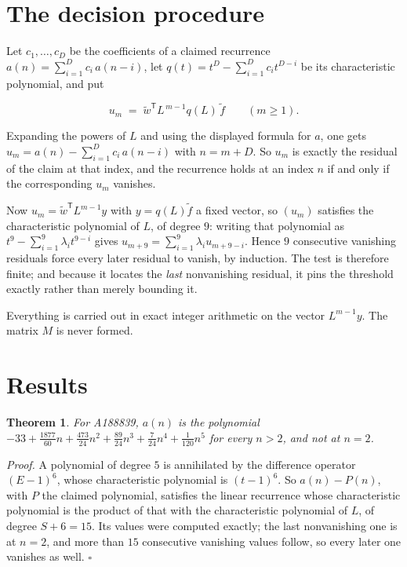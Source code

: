 \documentclass[11pt]{article}
\newtheorem{theorem}{Theorem}
\theoremstyle{definition}
\begin{document}
\section{The decision procedure}

Let $c_1,\dots,c_D$ be the coefficients of a claimed recurrence $a(n) = \sum_{i=1}^{D} c_i\,a(n-i)$, let $q(t) = t^{D} - \sum_{i=1}^{D} c_i t^{D-i}$ be its characteristic polynomial, and put

\[u_m \;=\; \tilde w^{\mathsf T} L^{\,m-1} q(L)\,\tilde f \qquad (m \ge 1).\]

Expanding the powers of $L$ and using the displayed formula for $a$, one gets $u_m = a(n) - \sum_{i=1}^{D} c_i\,a(n-i)$ with $n = m + D$. So $u_m$ is exactly the residual of the claim at that index, and the recurrence holds at an index $n$ if and only if the corresponding $u_m$ vanishes.

Now $u_m = \tilde w^{\mathsf T} L^{m-1} y$ with $y = q(L)\tilde f$ a fixed vector, so $(u_m)$ satisfies the characteristic polynomial of $L$, of degree $9$: writing that polynomial as $t^{9} - \sum_{i=1}^{9} \lambda_i t^{9-i}$ gives $u_{m+9} = \sum_{i=1}^{9} \lambda_i u_{m+9-i}$. Hence $9$ consecutive vanishing residuals force every later residual to vanish, by induction. The test is therefore finite; and because it locates the {\itshape last} nonvanishing residual, it pins the threshold exactly rather than merely bounding it.

Everything is carried out in exact integer arithmetic on the vector $L^{m-1}y$. The matrix $M$ is never formed.

\section{Results}

\begin{theorem} For A188839, $a(n)$ is the polynomial $-33 + \frac{1877}{60}n + \frac{473}{24}n^{2} + \frac{89}{24}n^{3} + \frac{7}{24}n^{4} + \frac{1}{120}n^{5}$ for every $n > 2$, and not at $n = 2$.\end{theorem}

{\itshape Proof.} A polynomial of degree $5$ is annihilated by the difference operator $(E-1)^{6}$, whose characteristic polynomial is $(t-1)^{6}$. So $a(n) - P(n)$, with $P$ the claimed polynomial, satisfies the linear recurrence whose characteristic polynomial is the product of that with the characteristic polynomial of $L$, of degree $S + 6 = 15$. Its values were computed exactly; the last nonvanishing one is at $n = 2$, and more than $15$ consecutive vanishing values follow, so every later one vanishes as well. $\square$
\end{document}
